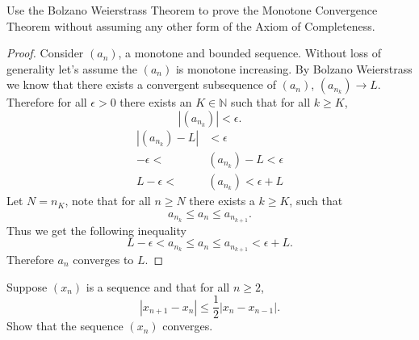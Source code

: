 \documentclass[12pt]{article}
\makeatletter
\theoremstyle{homework}
\newenvironment{exercise}[1]
{\def\@currentlabel{#1}\exercisecore}
{\endexercisecore}
\newcommand{\Nats}{\ensuremath{\mathbb N}}
\makeatother
\begin{document}
\begin{exercise}{7} Use the Bolzano Weierstrass Theorem to prove the Monotone Convergence Theorem 
  without assuming any other form of the Axiom of Completeness.\\
  
  \begin{proof} Consider $(a_n)$, a monotone and bounded sequence. Without loss of generality let's assume
    the $(a_n)$ is monotone increasing. By Bolzano Weierstrass we know that there exists a convergent subsequence of $(a_n)$,
    $(a_{n_k}) \to L$. Therefore for all $\epsilon > 0$ there exists an $K \in \Nats$ such that for all $k \geq K$,
    \begin{equation*}
      |(a_{n_k})| < \epsilon.
    \end{equation*} 
    \begin{align*}
      |(a_{n_k}) - L| &< \epsilon\\
      -\epsilon < &(a_{n_k}) - L < \epsilon\\
      L - \epsilon < &(a_{n_k})< \epsilon + L
    \end{align*}
    Let $N = n_K$, note that for all $n \geq N$ there exists a $k \geq K$, such that
    \begin{equation*}
      a_{n_k} \le a_n \le a_{n_{k+1}}.
    \end{equation*}
    Thus we get the following inequality
    \begin{equation*}
      L - \epsilon < a_{n_k} \le a_n \le a_{n_{k+1}}< \epsilon + L.
    \end{equation*}
    Therefore $a_n$ converges to $L$. 
  \end{proof}




  \begin{exercise}{8} Suppose $(x_n)$ is a sequence and that for all $n \geq 2$,
    \begin{equation*}
      |x_{n+1} - x_n| \le \dfrac{1}{2} |x_n - x_{n-1}|.
    \end{equation*}
    Show that the sequence $(x_n)$ converges. \\


\end{exercise}
\end{exercise}
\end{document}
